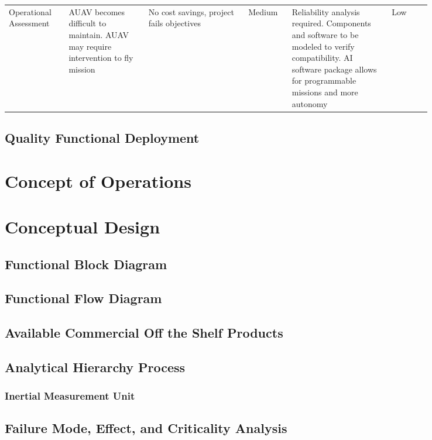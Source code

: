 \begin{landscape}
{\begin{longtable}{| p{0.12\linewidth} | p{0.16\linewidth} |  p{0.20\linewidth} | p{0.08\linewidth} | p{0.20\linewidth} | p{0.08\linewidth} |}
	\hline
	Operational Assessment & AUAV becomes difficult to maintain. \newline AUAV may require intervention to fly mission & No cost savings, project fails objectives & \cellcolor{yellow} Medium & Reliability analysis required. \newline Components and software to be modeled to verify compatibility. \newline AI software package allows for programmable missions and more autonomy & \cellcolor{green} Low
	\label{tab:sr01_feasibility}
\end{longtable}
}

\end{landscape}

\subsection{Quality Functional Deployment} \label{ssec:qfd}

\section{Concept of Operations} \label{sec:conops}

\section{Conceptual Design} \label{sec:conceptual_design}

\subsection{Functional Block Diagram} \label{ssec:block_diagram}

\subsection{Functional Flow Diagram} \label{ssec:flow_diagram}

\subsection{Available Commercial Off the Shelf Products} \label{ssec:cots_products}

\subsection{Analytical Hierarchy Process} \label{ssec:ahp}

\subsubsection*{Inertial Measurement Unit} \label{sssec:ahp_imu}

\subsection{Failure Mode, Effect, and Criticality Analysis} \label{ssec:fmeca}